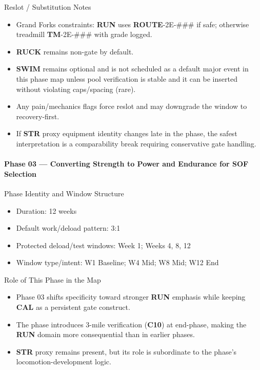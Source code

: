 \documentclass[10pt]{article}
\begin{document}
Reslot / Substitution Notes

\begin{itemize}
\item Grand Forks constraints: \textbf{RUN} uses \textbf{ROUTE}-2E-### if safe; otherwise treadmill \textbf{TM}-2E-### with grade logged.
\item \textbf{RUCK} remains non-gate by default.
\item \textbf{SWIM} remains optional and is not scheduled as a default major event in this phase map unless pool verification is stable and it can be inserted without violating caps/spacing (rare).
\item Any pain/mechanics flags force reslot and may downgrade the window to recovery-first.
\item If \textbf{STR} proxy equipment identity changes late in the phase, the safest interpretation is a comparability break requiring conservative gate handling.
\end{itemize}

\newpage

\paragraph*{Phase 03 — Converting Strength to Power and Endurance for SOF Selection}

Phase Identity and Window Structure

\begin{itemize}
\item Duration: 12 weeks
\item Default work/deload pattern: 3:1
\item Protected deload/test windows: Week 1; Weeks 4, 8, 12
\item Window type/intent: W1 Baseline; W4 Mid; W8 Mid; W12 End
\end{itemize}

Role of This Phase in the Map

\begin{itemize}
\item Phase 03 shifts specificity toward stronger \textbf{RUN} emphasis while keeping \textbf{CAL} as a persistent gate construct.
\item The phase introduces 3-mile verification (\textbf{C10}) at end-phase, making the \textbf{RUN} domain more consequential than in earlier phases.
\item \textbf{STR} proxy remains present, but its role is subordinate to the phase’s locomotion-development logic.
\end{itemize}
\end{document}
